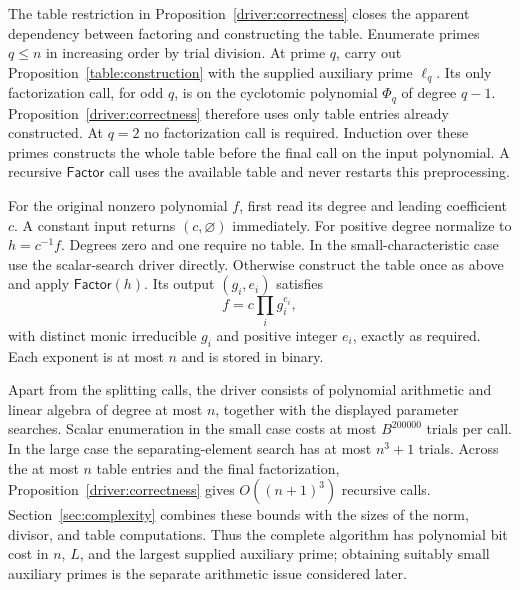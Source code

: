 The table restriction in Proposition~\ref{driver:correctness} closes the
apparent dependency between factoring and constructing the table.  Enumerate
primes $q\le n$ in increasing order by trial division.  At prime $q$, carry
out Proposition~\ref{table:construction} with the supplied auxiliary prime
$\ell_q$.  Its only factorization call, for odd $q$, is on the cyclotomic
polynomial $\Phi_q$ of degree $q-1$.  Proposition~\ref{driver:correctness}
therefore uses only table entries already constructed.  At $q=2$ no
factorization call is required.  Induction over these primes constructs the
whole table before the final call on the input polynomial.  A recursive
$\mathsf{Factor}$ call uses the available table and never restarts this
preprocessing.

For the original nonzero polynomial $f$, first read its degree and leading
coefficient $c$.  A constant input returns $(c,\varnothing)$ immediately.
For positive degree normalize to $h=c^{-1}f$.  Degrees zero and one require
no table.  In the small-characteristic case use the scalar-search driver
directly.  Otherwise construct the table once as above and apply
$\mathsf{Factor}(h)$.  Its output $(g_i,e_i)$ satisfies
\[
 f=c\prod_i g_i^{e_i},
\]
with distinct monic irreducible $g_i$ and positive integer $e_i$, exactly as
required.  Each exponent is at most $n$ and is stored in binary.

Apart from the splitting calls, the driver consists of polynomial arithmetic
and linear algebra of degree at most $n$, together with the displayed
parameter searches.  Scalar enumeration in the small case costs at most
$B^{200000}$ trials per call.  In the large case the separating-element
search has at most $n^3+1$ trials.  Across the at most $n$ table entries and
the final factorization, Proposition~\ref{driver:correctness} gives
$O((n+1)^3)$ recursive calls.  Section~\ref{sec:complexity} combines these
bounds with the sizes of the norm, divisor, and table computations.  Thus
the complete algorithm has polynomial bit cost in $n$, $L$, and the largest
supplied auxiliary prime; obtaining suitably small auxiliary primes is the
separate arithmetic issue considered later.
